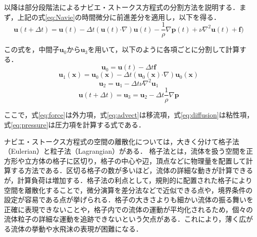 \documentclass[a4j,12pt]{jreport}
\begin{document}
以降は部分段階法によるナビエ・ストークス方程式の分割方法を説明する．まず，上記の式\ref{eq:Navie}の時間微分に前進差分を適用し，以下を得る．
\[
\bm{u} (t + \varDelta t) =   \bm{u} (t)-\varDelta t (\bm{u} (t)  \boldsymbol{\cdot}\nabla) \bm{u} (t)- \frac{1}{\rho}\nabla \bm{p}  (t)  + \nu\nabla^2\bm{u} (t)  + \bm{f}) 
\]

この式を，中間子$\bm{u}_0$から$\bm{u}_3$を用いて，以下のように各項ごとに分割して計算する．
\begin{equation}\label{eq:force}
	\bm{u}_0 =  \bm{u} (t)  - \varDelta t \bm{f} 
\end{equation} 
\begin{equation}\label{eq:advect}
	\bm{u}_1 (\bm{x}) = \bm{u}_0 (\bm{x}) - \varDelta t (\bm{u}_0(\bm{x})  \boldsymbol{\cdot}\nabla) \bm{u}_0(\bm{x})
\end{equation}
\begin{equation}\label{eq:diffusion}
	\bm{u}_2   =  \bm{u}_1 - \varDelta t \nu\nabla^2\bm{u}_1
\end{equation}
\begin{equation}\label{eq:pressure}
	\bm{u} (t + \varDelta t)= \bm{u}_3  =  \bm{u}_2 - \varDelta t \frac{1}{\rho}\nabla \bm{p} 
\end{equation} 

ここで，式\ref{eq:force}は外力項，式\ref{eq:advect}は移流項，式\ref{eq:diffusion}は粘性項，式\ref{eq:pressure}は圧力項を計算する式である．



ナビエ・ストークス方程式の空間の離散化については，大きく分けて格子法（Eulerian）と粒子法（Lagrangian）がある．
格子法とは，流体を扱う空間を正方形や立方体の格子に区切り，格子の中心や辺，頂点などに物理量を配置して計算する方法である．区切る格子の数が多いほど，流体の詳細な動きが計算できるが，計算負荷は増加する．格子法の利点として，規則的に配置された格子により空間を離散化することで，微分演算を差分法などで近似できる点や，境界条件の設定が容易である点が挙げられる．格子の大きさよりも細かい流体の振る舞いを正確に表現できないことや，格子内での流体の運動が平均化されるため，個々の流体粒子の詳細な運動を追跡できないという欠点がある．これにより，薄く広がる流体の挙動や水飛沫の表現が困難になる．
\end{document}
